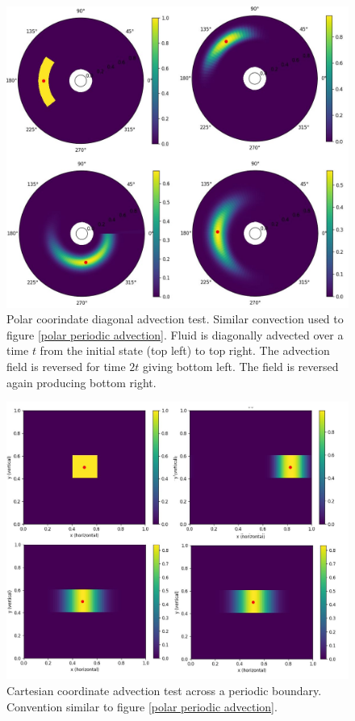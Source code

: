 \documentclass{article}
\begin{document}
\begin{figure}[h!]
	\centering
	\includegraphics{polarDiagonal/PolarDiagonalFigure.jpg}
	\caption{ Polar coorindate diagonal advection test. Similar convection used to figure \ref{polar periodic advection}. Fluid is diagonally advected over a time $t$ from the initial state (top left) to top right. The advection field is reversed for time $2t$ giving bottom left. The field is reversed again producing bottom right.}
	\label{polar diagonal advection}
\end{figure}
 
\begin{figure}[h!]
	\centering
	\includegraphics{cartesianPeriodic/CartesianPeriodicFigure.jpg}
	\caption{Cartesian coordinate advection test across a periodic boundary. Convention similar to figure \ref{polar periodic advection}.}
	\label{cartesian periodic advection}
\end{figure}
\end{document}
